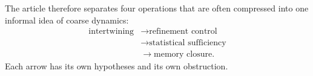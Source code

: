 \documentclass{aomart}
\theoremstyle{definition}
\theoremstyle{remark}
\begin{document}
The article therefore separates four operations that are often compressed into one informal idea of coarse dynamics:
\[
\begin{aligned}
\text{intertwining}
&\longrightarrow
\text{refinement control}\\
&\longrightarrow
\text{statistical sufficiency}\\
&\longrightarrow
\text{memory closure}.
\end{aligned}
\]
Each arrow has its own hypotheses and its own obstruction.




\end{document}
